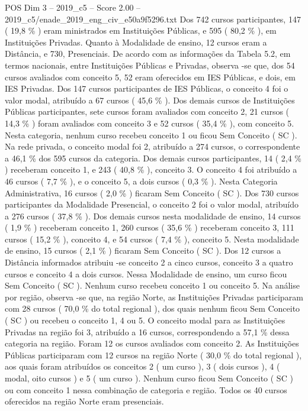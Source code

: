 \begin{textsample}{POS Dim 3 – 2019\_c5 – Score 2.00 – 2019\_c5/enade\_2019\_eng\_civ\_e50a9f5296.txt}
Dos 742 cursos participantes, 147 ( 19,8 \% ) eram ministrados em Instituições Públicas, e 595 ( 80,2 \% ), em Instituições Privadas.
Quanto à Modalidade de ensino, 12 cursos eram a Distância, e 730, Presenciais.
De acordo com as informações da Tabela 5.2, em termos nacionais, entre Instituições Públicas e Privadas, observa -se que, dos 54 cursos avaliados com conceito 5, 52 eram oferecidos em IES Públicas, e dois, em IES Privadas.
Dos 147 cursos participantes de IES Públicas, o conceito 4 foi o valor modal, atribuído a 67 cursos ( 45,6 \% ).
Dos demais cursos de Instituições Públicas participantes, sete cursos foram avaliados com conceito 2, 21 cursos ( 14,3 \% ) foram avaliados com conceito 3 e 52 cursos ( 35,4 \% ), com conceito 5.
Nesta categoria, nenhum curso recebeu conceito 1 ou ficou Sem Conceito ( SC ).
Na rede privada, o conceito modal foi 2, atribuído a 274 cursos, o correspondente a 46,1 \% dos 595 cursos da categoria.
Dos demais cursos participantes, 14 ( 2,4 \% ) receberam conceito 1, e 243 ( 40,8 \% ), conceito 3.
O conceito 4 foi atribuído a 46 cursos ( 7,7 \% ), e o conceito 5, a dois cursos ( 0,3 \% ).
Nesta Categoria Administrativa, 16 cursos ( 2,0 \% ) ficaram Sem Conceito ( SC ).
Dos 730 cursos participantes da Modalidade Presencial, o conceito 2 foi o valor modal, atribuído a 276 cursos ( 37,8 \% ).
Dos demais cursos nesta modalidade de ensino, 14 cursos ( 1,9 \% ) receberam conceito 1, 260 cursos ( 35,6 \% ) receberam conceito 3, 111 cursos ( 15,2 \% ), conceito 4, e 54 cursos ( 7,4 \% ), conceito 5.
Nesta modalidade de ensino, 15 cursos ( 2,1 \% ) ficaram Sem Conceito ( SC ).
Dos 12 cursos a Distância informados atribuiu -se conceito 2 a cinco cursos, conceito 3 a quatro cursos e conceito 4 a dois cursos.
Nessa Modalidade de ensino, um curso ficou Sem Conceito ( SC ).
Nenhum curso recebeu conceito 1 ou conceito 5.
Na análise por região, observa -se que, na região Norte, as Instituições Privadas participaram com 28 cursos ( 70,0 \% do total regional ), dos quais nenhum ficou Sem Conceito ( SC ) ou recebeu o conceito 1, 4 ou 5.
O conceito modal para as Instituições Privadas na região foi 3, atribuído a 16 cursos, correspondendo a 57,1 \% dessa categoria na região.
Foram 12 os cursos avaliados com conceito 2.
As Instituições Públicas participaram com 12 cursos na região Norte ( 30,0 \% do total regional ), aos quais foram atribuídos os conceitos 2 ( um curso ), 3 ( dois cursos ), 4 ( modal, oito cursos ) e 5 ( um curso ).
Nenhum curso ficou Sem Conceito ( SC ) ou com conceito 1 nessa combinação de categoria e região.
Todos os 40 cursos oferecidos na região Norte eram presenciais.

\end{textsample}
